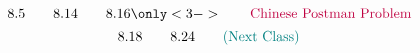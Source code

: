 
\begin{frame}{}

  \pause
  \[
    8.5 \qquad 8.14 \qquad 8.16 \only<3->{\qquad \text{\purple{Chinese Postman Problem}}}
  \]
  \[
    8.18 \qquad 8.24 \qquad \text{\textcolor{teal}{(Next Class)}}
  \]
\end{frame}

